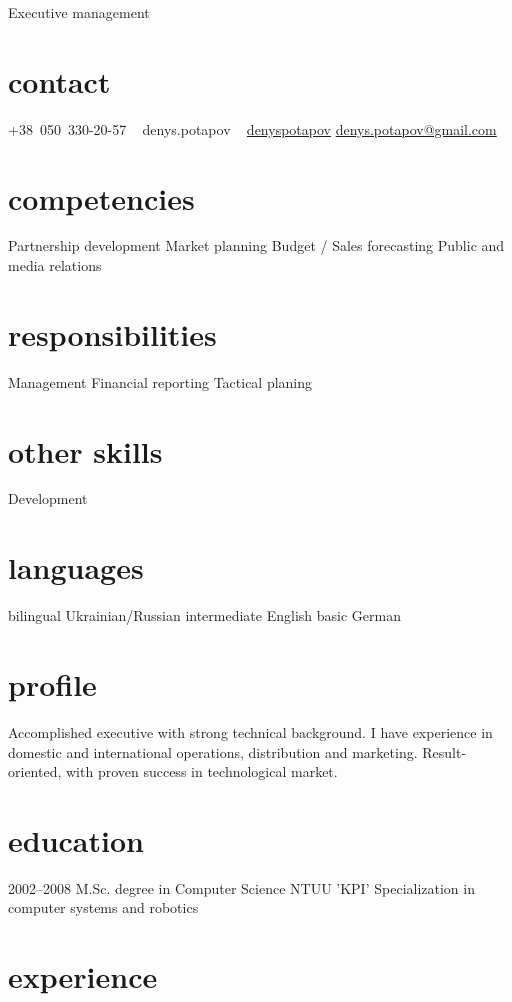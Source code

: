 \documentclass[hidelinks,a4paper]{cv}
\providecommand\faSkype{{\FA\symbol{"F17E}}}
\begin{document}
       {Executive management}

\begin{aside}
  \section{contact}
     +38~050~330-20-57
     \faSkype~ denys.potapov
     \faLinkedin~ \href{https://www.linkedin.com/in/denyspotapov}{denyspotapov}
     \href{mailto:denys.potapov@gmail.com}{denys.potapov@gmail.com}
  \section{competencies}
    Partnership development
    Market planning
    Budget / Sales forecasting
    Public and media relations
  \section{responsibilities}
    Management
    Financial reporting
    Tactical planing
  \section{other skills}
    Development
  \section{languages}
    bilingual Ukrainian/Russian
    intermediate English
    basic German
\end{aside}

\section{profile}
Accomplished executive with strong technical background. I have experience in domestic and international operations, distribution and marketing. Result-oriented, with proven success in technological market.
\section{education}

\begin{entrylist}
  \entry
    {2002–2008}
    {M.Sc. degree in Computer Science}
    {NTUU 'KPI'}
    {Specialization in computer systems and robotics}
\end{entrylist}

\section{experience}
\end{document}
